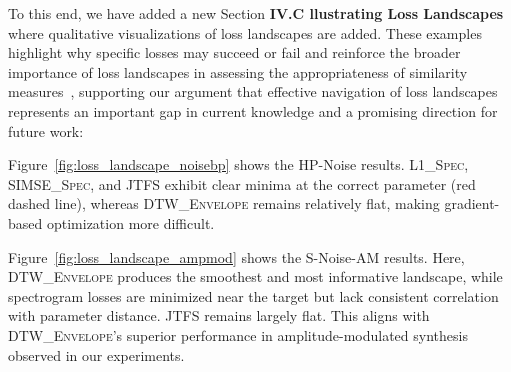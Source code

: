 \documentclass[11pt]{article}
\newcommand{\DTWEnv}{\textsc{DTW\_Envelope}}
\newcommand{\SIMSESpec}{\textsc{SIMSE\_Spec}}
\newcommand{\LoneSpec}{\textsc{L1\_Spec}}
\newcommand{\JTFS}{\textsc{JTFS}}
\begin{document}
To this end, we have added a new Section \textbf{IV.C llustrating Loss Landscapes} where qualitative visualizations of loss landscapes  are added. These examples highlight why specific losses may succeed or fail and reinforce the broader importance of loss landscapes in assessing the appropriateness of similarity measures~\cite{vahidi2023mesostructures,turian2020sorry}, supporting our argument that effective navigation of loss landscapes represents an important gap in current knowledge and a promising direction for future work:


\begin{displayquote}
    Figure~\ref{fig:loss_landscape_noisebp} shows the HP-Noise results. \LoneSpec{}, \SIMSESpec{}, and \JTFS{} exhibit clear minima at the correct parameter (red dashed line), whereas \DTWEnv{} remains relatively flat, making gradient-based optimization more difficult.

    Figure~\ref{fig:loss_landscape_ampmod} shows the S-Noise-AM results. Here, \DTWEnv{} produces the smoothest and most informative landscape, while spectrogram losses are minimized near the target but lack consistent correlation with parameter distance. \JTFS{} remains largely flat. This aligns with \DTWEnv's superior performance in amplitude-modulated synthesis observed in our experiments.
\end{displayquote}
\end{document}
